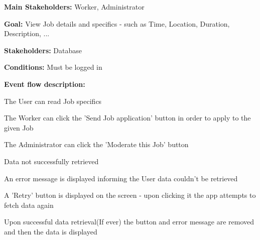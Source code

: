 				\noindent {}
				\begin{packed_item}
					\item \textbf{Main Stakeholders:} Worker, Administrator
					\item \textbf{Goal:} View Job details and specifics - such as Time, Location, Duration, Description, ...
					\item \textbf{Stakeholders: } Database
					\item \textbf{Conditions: } Must be logged in
					\item \textbf{Event flow description: }
					\begin{packed_enum}
						\item The User can read Job specifics
						\item The Worker can click the 'Send Job application' button in order to apply to the given Job
						\item The Administrator can click the 'Moderate this Job' button
					\end{packed_enum}
					
					\begin{packed_item}
						\item[1.a] Data not successfully retrieved
						\item[] \begin{packed_enum}
							\item An error message is displayed informing the User data couldn't be retrieved
							\item A 'Retry' button is displayed on the screen - upon clicking it the app attempts to fetch data again
							\item Upon successful data retrieval(If ever) the button and error message are removed and then the data is displayed
						\end{packed_enum}
					\end{packed_item}
				\end{packed_item}
			

